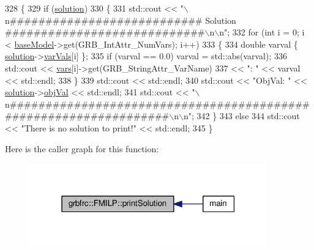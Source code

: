 \begin{DoxyCode}
328  \{
329   \textcolor{keywordflow}{if} (\hyperlink{classgrbfrc_1_1FMILP_ae7b20c4efb2d3a689d46a5b88329b207}{solution})
330    \{
331     std::cout << \textcolor{stringliteral}{"\(\backslash\)n########################### Solution ############################\(\backslash\)n\(\backslash\)n"};
332     \textcolor{keywordflow}{for} (\textcolor{keywordtype}{int} i = 0; i < \hyperlink{classgrbfrc_1_1FMILP_a587e886dcaa1ece325a7f283100182a8}{baseModel}->get(GRB\_IntAttr\_NumVars); i++)
333      \{
334       \textcolor{keywordtype}{double} varval \{ \hyperlink{classgrbfrc_1_1FMILP_ae7b20c4efb2d3a689d46a5b88329b207}{solution}->\hyperlink{structgrbfrc_1_1FMILPSol_a36afbb370bb174c488c46b882c0c9bbf}{varVals}[i] \};
335       \textcolor{keywordflow}{if} (varval == 0.0) varval = std::abs(varval);
336       std::cout << \hyperlink{classgrbfrc_1_1FMILP_acbf6866651d8b8b18c094302cf2a4284}{vars}[i]->get(GRB\_StringAttr\_VarName)
337                 << \textcolor{stringliteral}{": "} << varval << std::endl;
338      \}
339     std::cout << std::endl;
340     std::cout << \textcolor{stringliteral}{"ObjVal: "} << \hyperlink{classgrbfrc_1_1FMILP_ae7b20c4efb2d3a689d46a5b88329b207}{solution}->\hyperlink{structgrbfrc_1_1FMILPSol_a63fec0e4c5df880215f3de25e8605505}{objVal} << std::endl;
341     std::cout << \textcolor{stringliteral}{"\(\backslash\)n#################################################################\(\backslash\)n\(\backslash\)n"};
342    \}
343   \textcolor{keywordflow}{else}
344     std::cout << \textcolor{stringliteral}{"There is no solution to print!"} << std::endl;
345  \}
\end{DoxyCode}


Here is the caller graph for this function\+:
\nopagebreak
\begin{figure}[H]
\begin{center}
\leavevmode
\includegraphics[width=291pt]{classgrbfrc_1_1FMILP_a981a9d57ccb5c0410314be4de6bd0897_icgraph}
\end{center}
\end{figure}


